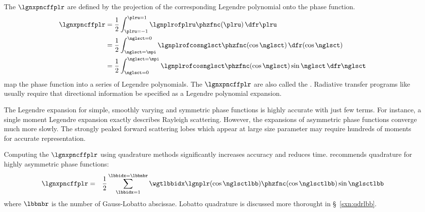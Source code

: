 \documentclass[12pt]{article}
\begin{document}
The  $\lgnxpncffplr$ are defined
by the projection of the corresponding Legendre polynomial onto
the phase function.
\begin{subequations}
\label{eqn:lgn_xpn_cff}
\begin{align}
\lgnxpncffplr & =
\frac{1}{2}
\int_{\plru = -1}^{\plru = 1} 
\lgnplrofplru \phzfnc(\plru) \,\dfr\plru \\
& =
\frac{1}{2}
\int_{\nglsct = \mpi}^{\nglsct = 0} 
\lgnplrofcosnglsct \phzfnc(\cos\nglsct) \,\dfr(\cos\nglsct) \\
& =
\frac{1}{2}
\int_{\nglsct = 0}^{\nglsct = \mpi} 
\lgnplrofcosnglsct \phzfnc(\cos\nglsct) \sin\nglsct \,\dfr\nglsct
\end{align}
\end{subequations}
map the phase function into a series of Legendre polynomials.
The $\lgnxpncffplr$ are also called the 
.
Radiative transfer programs like  \citep{STW88}
usually require that directional information be specified as
a Legendre polynomial expansion.

The Legendre expansion for simple, smoothly varying and symmetric
phase functions is highly accurate with just few terms.
For instance, a single moment Legendre expansion exactly describes
Rayleigh scattering.
However, the expansions of asymmetric phase functions converge
much more slowly.
The strongly peaked forward scattering lobes which appear at
large size parameter may require hundreds of moments for accurate
representation.

Computing the $\lgnxpncffplr$ using quadrature methods significantly
increases accuracy and reduces time.
\citet{Wis771} recommends  quadrature for
highly asymmetric phase functions:
\begin{eqnarray}
\label{eqn:lgn_xpn_cff_lbb}
\lgnxpncffplr & = &
\frac{1}{2}
\sum_{\lbbidx = 1}^{\lbbidx = \lbbnbr} 
\wgtlbbidx \lgnplr(\cos\nglsctlbb) \phzfnc(\cos\nglsctlbb) \sin\nglsctlbb
\end{eqnarray}
where $\lbbnbr$ is the number of Gauss-Lobatto abscissae.
Lobatto quadrature is discussed more thorought in \S~\ref{sxn:qdrlbb}.
\end{document}
